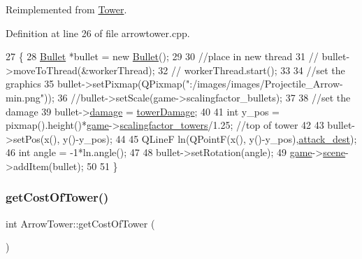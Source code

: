 Reimplemented from \hyperlink{class_tower_aa0c9c780f48cffacd3da6877f5d4fdc2}{Tower}.



Definition at line 26 of file arrowtower.\+cpp.


\begin{DoxyCode}
27 \{
28     \hyperlink{class_bullet}{Bullet} *bullet = \textcolor{keyword}{new} \hyperlink{class_bullet}{Bullet}();
29 
30     \textcolor{comment}{//place in new thread}
31 \textcolor{comment}{//    bullet->moveToThread(&workerThread);}
32 \textcolor{comment}{//    workerThread.start();}
33 
34     \textcolor{comment}{//set the graphics}
35     bullet->setPixmap(QPixmap(\textcolor{stringliteral}{":/images/images/Projectile\_Arrow-min.png"}));
36     \textcolor{comment}{//bullet->setScale(game->scalingfactor\_bullets);}
37 
38     \textcolor{comment}{//set the damage}
39     bullet->\hyperlink{class_bullet_a733d2ebbf9143c9ca68d3eb7e14121d0}{damage} = \hyperlink{class_arrow_tower_a3623752851bb010bb650ca63ed9dd26c}{towerDamage};
40 
41     \textcolor{keywordtype}{int} y\_pos = pixmap().height()*\hyperlink{arrowtower_8cpp_a58bdb5643d0814ac4e697a1564b79b70}{game}->\hyperlink{class_game_a6c1ca48f17f6934432d01bfa7f762a04}{scalingfactor\_towers}/1.25; \textcolor{comment}{//top of tower}
42 
43     bullet->setPos(x(), y()-y\_pos);
44 
45     QLineF ln(QPointF(x(), y()-y\_pos),\hyperlink{class_tower_a2b3e8ab90ccceed1fa3a667db80c2c06}{attack\_dest});
46     \textcolor{keywordtype}{int} angle = -1*ln.angle();
47 
48     bullet->setRotation(angle);
49     \hyperlink{arrowtower_8cpp_a58bdb5643d0814ac4e697a1564b79b70}{game}->\hyperlink{class_game_a8119e3b9a632906c6808fa294b46a92a}{scene}->addItem(bullet);
50 
51 \}
\end{DoxyCode}
\mbox{\label{class_arrow_tower_a1ef82141056a39071f89d1c360728116}} 
\subsubsection{\texorpdfstring{get\+Cost\+Of\+Tower()}{getCostOfTower()}}
{\footnotesize\ttfamily int Arrow\+Tower\+::get\+Cost\+Of\+Tower (\begin{DoxyParamCaption}{ }\end{DoxyParamCaption})\hspace{0.3cm}{\ttfamily [virtual]}}



